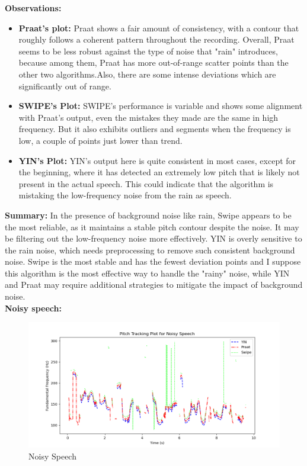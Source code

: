 \documentclass{../labbook}
\begin{document}
\begin{solution}
\textbf{Observations:}
\begin{itemize}
    \item \textbf{Praat's plot:} Praat shows a fair amount of consistency, with a contour that roughly follows a coherent pattern throughout the recording. Overall, Praat seems to be less robust against the type of noise that "rain" introduces, because among them, Praat has more out-of-range scatter points than the other two algorithms.Also, there are some intense deviations which are significantly out of range.



    \item \textbf{SWIPE's Plot:} SWIPE's performance is variable and shows some alignment with Praat's output, even the mistakes they made are the same in high frequency. But it also exhibits outliers and segments when the frequency is low, a couple of points just lower than trend.



    \item \textbf{YIN's Plot:} YIN's output here is quite consistent in most cases, except for the beginning, where it has detected an extremely low pitch that is likely not present in the actual speech. This could indicate that the algorithm is mistaking the low-frequency noise from the rain as speech.


\end{itemize}

\textbf{Summary:} In the presence of background noise like rain, Swipe appears to be the most reliable, as it maintains a stable pitch contour despite the noise. It may be filtering out the low-frequency noise more effectively. YIN is overly sensitive to the rain noise, which needs preprocessing to remove such consistent background noise. Swipe is the most stable and has the fewest deviation points and I suppose this algorithm is the most effective way to handle the "rainy" noise, while YIN and Praat may require additional strategies to mitigate the impact of background noise.\\

\textbf{Noisy speech:}
\begin{figure}[h]
    \centering
    \includegraphics[width=0.8\linewidth]{recording5_noisy_m_pitch_plot.png}
    \caption{Noisy Speech}
    

\end{figure}
\end{solution}
\end{document}

